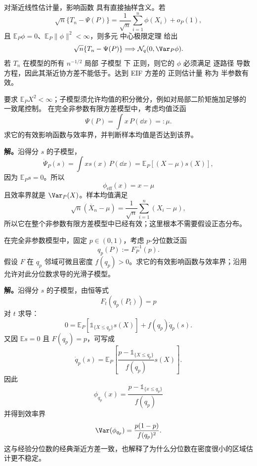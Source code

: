 \begin{proposition}[渐近线性估计的抽样含义]
对渐近线性估计量，影响函数 具有直接抽样含义。若
\begin{equation*}\sqrt n\{T_n-\Psi(P)\}
=
\frac1{\sqrt n}
\sum_{i=1}^n\phi(X_i)
+o_P(1),\end{equation*}
且 $\mathbb E_P\phi=0$、$\mathbb E_P\|\phi\|^2<\infty$，则多元 中心极限定理 给出
\[
\sqrt n\{T_n-\Psi(P)\}
\Longrightarrow
\mathcal N_q(0,\Var_P\phi).
\]
若 $T_n$ 在模型的所有 $n^{-1/2}$ 局部 子模型 下 正则，则它的 $\phi$ 必须满足 逐路径 导数 方程，因此其渐近协方差不能低于。达到 EIF 方差的 正则估计量 称为 半参数有效。
\end{proposition}

\begin{workedexample}[均值的有效影响函数]
要求 $\mathbb E_PX^2<\infty$；子模型须允许均值的积分微分，例如对局部二阶矩施加足够的一致尾控制。
在完全非参数有限方差模型中，考虑均值泛函
\[
\Psi(P)=\int x\,P(\dd x)=:\mu.
\]
求它的有效影响函数与效率界，并判断样本均值是否达到该界。

\textbf{解。}沿得分 $s$ 的子模型，
\[
\dot\Psi_P(s)
=\int x s(x)\,P(\dd x)
=\mathbb E_P[(X-\mu)s(X)],
\]
因为 $\mathbb E_Ps=0$。所以
\[
{
\phi_{\mathrm{eff}}(x)=x-\mu
}
\]
且效率界就是 $\Var_P(X)$。样本均值满足
\[
\sqrt n(\overline X_n-\mu)
=\frac1{\sqrt n}\sum_{i=1}^n(X_i-\mu),
\]
所以它在整个非参数有限方差模型中已经有效；这里根本不需要假设正态分布。
\end{workedexample}

\begin{workedexample}[分位数的有效影响函数]
在完全非参数模型中，固定 $p\in(0,1)$，考虑 $p$-分位数泛函
\[
q_p(P):=F_P^{-1}(p).
\]
假设 $F$ 在 $q_p$ 邻域可微且密度 $f(q_p)>0$。求它的有效影响函数与效率界；沿用允许对此分位数求导的光滑子模型。

\textbf{解。}沿得分 $s$ 的子模型，由恒等式
\[
F_t(q_p(P_t))=p
\]
对 $t$ 求导：
\[
0
=
\mathbb E_P[\mathds{1}_{\{X\le q_p\}}s(X)]
+f(q_p)\dot q_p(s).
\]
又因 $\mathbb E s=0$ 且 $F(q_p)=p$，可写成
\[
\dot q_p(s)
=
\mathbb E_P\left[
\frac{p-\mathds{1}_{\{X\le q_p\}}}{f(q_p)}s(X)
\right].
\]
因此
\begin{equation*}{
\phi_{q_p}(x)
=
\frac{p-\mathds{1}_{\{x\le q_p\}}}{f(q_p)}
}\end{equation*}
并得到效率界
\[
\Var(\phi_{q_p})
=
\frac{p(1-p)}{f(q_p)^2}.
\]
这与经验分位数的经典渐近方差一致，也解释了为什么分位数在密度很小的区域估计更不稳定。
\end{workedexample}

